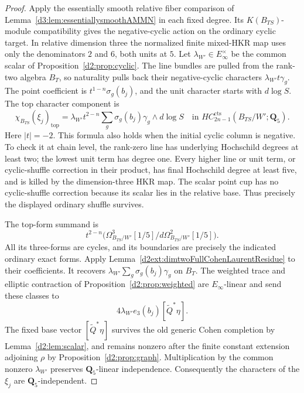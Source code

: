 \begin{proof}
Apply the essentially smooth relative fiber comparison of
Lemma~\ref{d3:lem:essentiallysmoothAMMN} in each fixed degree.
Its $K(B_{TS})$-module compatibility gives the negative-cyclic
action on the ordinary cyclic target.  In relative dimension
three the normalized finite mixed-HKR map uses only the
denominators $2$ and $6$, both units at $5$.
Let $\lambda_{W'}\in E_\infty^\times$ be the common scalar of
Proposition~\ref{d2:prop:cyclic}.
The line bundles are pulled from the rank-two algebra $B_T$,
so naturality pulls back their negative-cyclic characters
$\lambda_{W'}t\gamma_g$.
The point coefficient is $t^{1-n}\sigma_g(b_j)$, and the
unit character starts with $d\log S$.
The top character component is
\[
 \chi_{B_{TS}}(\xi_j)_{\mathrm{top}}
    =\lambda_{W'}t^{2-n}
       \sum_g\sigma_g(b_j)\gamma_g\wedge d\log S
       \quad\text{in }HC^{\mathrm{cts}}_{2n-1}(B_{TS}/W';
                                                    \mathbf Q_5).
\]
Here $|t|=-2$.  This formula also holds when the initial cyclic
column is negative.  To check it at chain level, the rank-zero
line has underlying Hochschild degrees at least two; the
lowest unit term has degree one.  Every higher line or unit
term, or cyclic-shuffle correction in their product, has final
Hochschild degree at least five, and is killed by the
dimension-three HKR map.  The scalar point cup has no
cyclic-shuffle correction because its scalar lies in the
relative base.  Thus precisely the displayed ordinary
shuffle survives.

The top-form summand is
\[
 t^{2-n}\bigl(
 \Omega^3_{B_{TS}/W'}[1/5]/
                  d\Omega^2_{B_{TS}/W'}[1/5]\bigr).
\]
All its three-forms are cycles, and its boundaries are precisely
the indicated ordinary exact forms.  Apply
Lemma~\ref{d2ext:dimtwoFullCohenLaurentResidue} to their coefficients.
It recovers
$\lambda_{W'}\sum_g\sigma_g(b_j)\gamma_g$ on $B_T$.
The weighted trace and elliptic contraction of
Proposition~\ref{d2:prop:weighted} are $E_\infty$-linear and send
these classes to
\[
 4\lambda_{W'}e_3(b_j)[\widetilde Q^*\eta].
\]
The fixed base vector $[\widetilde Q^*\eta]$ survives the old generic
Cohen completion by Lemma~\ref{d2:lem:scalar}, and remains
nonzero after the finite constant extension adjoining $\rho$ by
Proposition~\ref{d2:prop:graph}.
Multiplication by the common nonzero $\lambda_{W'}$ preserves
$\mathbf Q_5$-linear independence.
Consequently the characters of the $\xi_j$ are
$\mathbf Q_5$-independent.


\end{proof}
